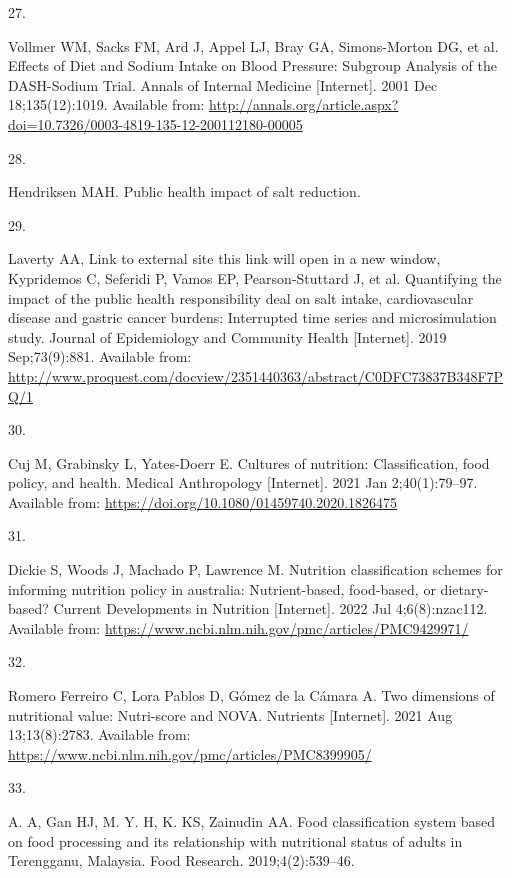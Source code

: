 \documentclass[
]{article}
\newlength{\cslhangindent}
\newlength{\csllabelwidth}
\newlength{\cslentryspacingunit} %
\newenvironment{CSLReferences}[2] %
 {%
  \setlength{\parindent}{0pt}
  \ifodd #1
  \let\oldpar\par
  \def\par{\hangindent=\cslhangindent\oldpar}
  \fi
  \setlength{\parskip}{#2\cslentryspacingunit}
 }%
 {}
\newcommand{\CSLLeftMargin}[1]{\parbox[t]{\csllabelwidth}{#1}}
\newcommand{\CSLRightInline}[1]{\parbox[t]{\linewidth - \csllabelwidth}{#1}\break}
\begin{document}
\begin{CSLReferences}{0}{0}
\leavevmode{}%
\CSLLeftMargin{27. }%
\CSLRightInline{Vollmer WM, Sacks FM, Ard J, Appel LJ, Bray GA,
Simons-Morton DG, et al. Effects of Diet and Sodium Intake on Blood
Pressure: Subgroup Analysis of the DASH-Sodium Trial. Annals of Internal
Medicine {[}Internet{]}. 2001 Dec 18;135(12):1019. Available from:
\url{http://annals.org/article.aspx?doi=10.7326/0003-4819-135-12-200112180-00005}}

\leavevmode{}%
\CSLLeftMargin{28. }%
\CSLRightInline{Hendriksen MAH. Public health impact of salt reduction.
}

\leavevmode{}%
\CSLLeftMargin{29. }%
\CSLRightInline{Laverty AA, Link to external site this link will open in
a new window, Kypridemos C, Seferidi P, Vamos EP, Pearson-Stuttard J, et
al. Quantifying the impact of the public health responsibility deal on
salt intake, cardiovascular disease and gastric cancer burdens:
Interrupted time series and microsimulation study. Journal of
Epidemiology and Community Health {[}Internet{]}. 2019 Sep;73(9):881.
Available from:
\url{http://www.proquest.com/docview/2351440363/abstract/C0DFC73837B348F7PQ/1}}

\leavevmode{}%
\CSLLeftMargin{30. }%
\CSLRightInline{Cuj M, Grabinsky L, Yates-Doerr E. Cultures of
nutrition: Classification, food policy, and health. Medical Anthropology
{[}Internet{]}. 2021 Jan 2;40(1):79--97. Available from:
\url{https://doi.org/10.1080/01459740.2020.1826475}}

\leavevmode{}%
\CSLLeftMargin{31. }%
\CSLRightInline{Dickie S, Woods J, Machado P, Lawrence M. Nutrition
classification schemes for informing nutrition policy in australia:
Nutrient-based, food-based, or dietary-based? Current Developments in
Nutrition {[}Internet{]}. 2022 Jul 4;6(8):nzac112. Available from:
\url{https://www.ncbi.nlm.nih.gov/pmc/articles/PMC9429971/}}

\leavevmode{}%
\CSLLeftMargin{32. }%
\CSLRightInline{Romero Ferreiro C, Lora Pablos D, Gómez de la Cámara A.
Two dimensions of nutritional value: Nutri-score and NOVA. Nutrients
{[}Internet{]}. 2021 Aug 13;13(8):2783. Available from:
\url{https://www.ncbi.nlm.nih.gov/pmc/articles/PMC8399905/}}

\leavevmode{}%
\CSLLeftMargin{33. }%
\CSLRightInline{A. A, Gan HJ, M. Y. H, K. KS, Zainudin AA. Food
classification system based on food processing and its relationship with
nutritional status of adults in Terengganu, Malaysia. Food Research.
2019;4(2):539--46. }


\end{CSLReferences}
\end{document}
